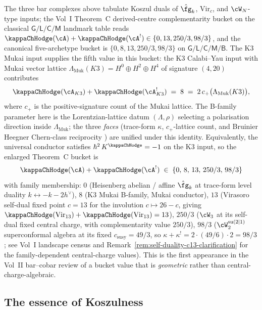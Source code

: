 \begin{remark}
\label{rem:bar-cobar-2-theoremC-bucket}
The three bar complexes above tabulate Koszul duals of
$\hat{\fg}_k$, $\mathrm{Vir}_c$, and $\cW_N$-type inputs; the Vol~I
Theorem~C derived-centre complementarity bucket on the classical
$\mathsf{G}/\mathsf{L}/\mathsf{C}/\mathsf{M}$ landmark table reads
$\kappaChHodge(\cA) + \kappaChHodge(\cA^!) \in \{0, 13, 250/3, 98/3\}$, and the
canonical five-archetype bucket is
$\{0, 8, 13, 250/3, 98/3\}$ on
$\mathsf{G}/\mathsf{L}/\mathsf{C}/\mathsf{M}/\mathsf{B}$. The
K3 Mukai input supplies the fifth value in this bucket: the
K3 Calabi--Yau input with Mukai vector lattice
$\Lambda_{\mathrm{Muk}}(K3) = H^0\oplus H^2\oplus H^4$ of signature
$(4,20)$ contributes
\[
\kappaChHodge(\cA_{K3}) + \kappaChHodge(\cA_{K3}^!) \;=\; 8
\;=\; 2\,c_+\bigl(\Lambda_{\mathrm{Muk}}(K3)\bigr),
\]
where $c_+$ is the positive-signature count of the Mukai lattice.
The B-family parameter here is the Lorentzian-lattice datum
$(\Lambda, \rho)$ selecting a polarisation direction inside
$\Lambda_{\mathrm{Muk}}$; the three \emph{faces}
(trace-form $\kappa$, $c_+$-lattice count, and Bruinier Heegner
Chern-class reciprocity \cite[Prop.~5.1]{Bru02}) are unified under
this identity. Equivalently, the universal conductor satisfies
$\hbar^2\,K^{\kappaChHodge} = -1$ on the K3 input, so the
enlarged Theorem~C bucket is
\[
\kappaChHodge(\cA) + \kappaChHodge(\cA^!) \;\in\; \{0,\, 8,\, 13,\, 250/3,\,
98/3\}
\]
with family membership:
$0$ (Heisenberg abelian / affine $\hat{\fg}_k$ at trace-form level
duality $k\leftrightarrow -k-2h^\vee$), $8$ (K3 Mukai B-family,
Mukai conductor), $13$ (Virasoro self-dual fixed point $c=13$
for the involution $c\mapsto 26-c$, giving
$\kappaChHodge(\mathrm{Vir}_{13})+\kappaChHodge(\mathrm{Vir}_{13})=13$),
$250/3$
($\cW_3$ at its self-dual fixed central charge,
with complementarity value $250/3$),
$98/3$
($\cW_2^{\mathrm{su}(2|1)}$ superconformal algebra at its fixed
$c_{\mathrm{susy}}=49/3$, so
$\kappa+\kappa^!=2\cdot(49/6)\cdot 2=98/3$; see Vol~I landscape
census and Remark~\ref{rem:self-duality-c13-clarification} for
the family-dependent central-charge values). This is the
first appearance in the Vol~II bar--cobar review of a bucket value
that is \emph{geometric} rather than central-charge-algebraic.
\end{remark}

\subsection{The essence of Koszulness}
\label{subsec:koszulness-essence}

